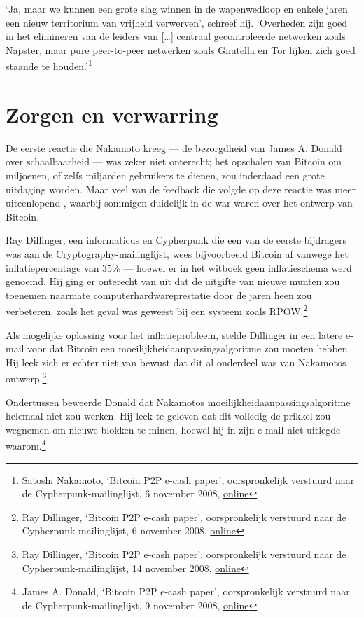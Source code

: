\documentclass[smalldemyvopaper,11pt,twoside,onecolumn,openright,extrafontsizes,hidelinks]{memoir}
\begin{document}
`Ja, maar we kunnen een grote slag winnen in de wapenwedloop en enkele
jaren een nieuw territorium van vrijheid verwerven', schreef hij.
`Overheden zijn goed in het elimineren van de leiders van {[}\ldots{]}
centraal gecontroleerde netwerken zoals Napster, maar pure peer-to-peer
netwerken zoals Gnutella en Tor lijken zich goed staande te
houden.'\footnote{Satoshi Nakamoto, `Bitcoin P2P e-cash paper',
  oorspronkelijk verstuurd naar de Cypherpunk-mailinglijst, 6 november
  2008,
  \href{https://www.metzdowd.com/pipermail/cryptography/2008-November/014823.html}{online}}

\section{Zorgen en verwarring}\label{zorgen-en-verwarring}

De eerste reactie die Nakamoto kreeg --- de bezorgdheid van James A.
Donald over schaalbaarheid --- was zeker niet onterecht; het opschalen
van Bitcoin om miljoenen, of zelfs miljarden gebruikers te dienen, zou
inderdaad een grote uitdaging worden. Maar veel van de feedback die
volgde op deze reactie was meer uiteenlopend , waarbij sommigen
duidelijk in de war waren over het ontwerp van Bitcoin.

Ray Dillinger, een informaticus en Cypherpunk die een van de eerste
bijdragers was aan de Cryptography-mailinglijst, wees bijvoorbeeld
Bitcoin af vanwege het inflatiepercentage van 35\% --- hoewel er in het
witboek geen inflatieschema werd genoemd. Hij ging er onterecht van uit
dat de uitgifte van nieuwe munten zou toenemen naarmate
computerhardwareprestatie door de jaren heen zou verbeteren, zoals het
geval was geweest bij een systeem zoals RPOW.\footnote{Ray Dillinger,
  `Bitcoin P2P e-cash paper', oorspronkelijk verstuurd naar de
  Cypherpunk-mailinglijst, 6 november 2008,
  \href{https://www.metzdowd.com/pipermail/cryptography/2008-November/014822.html}{online}}

Als mogelijke oplossing voor het inflatieprobleem, stelde Dillinger in
een latere e-mail voor dat Bitcoin een moeilijkheidaanpassingsalgoritme
zou moeten hebben. Hij leek zich er echter niet van bewust dat dit al
onderdeel was van Nakamotos ontwerp.\footnote{Ray Dillinger, `Bitcoin
  P2P e-cash paper', oorspronkelijk verstuurd naar de
  Cypherpunk-mailinglijst, 14 november 2008,
  \href{https://www.metzdowd.com/pipermail/cryptography/2008-November/014857.html}{online}}

Ondertussen beweerde Donald dat Nakamotos
moeilijkheidaanpassingsalgoritme helemaal niet zou werken. Hij leek te
geloven dat dit volledig de prikkel zou wegnemen om nieuwe blokken te
minen, hoewel hij in zijn e-mail niet uitlegde waarom.\footnote{James A.
  Donald, `Bitcoin P2P e-cash paper', oorspronkelijk verstuurd naar de
  Cypherpunk-mailinglijst, 9 november 2008,
  \href{https://www.metzdowd.com/pipermail/cryptography/2008-November/014837.html}{online}}
\end{document}
